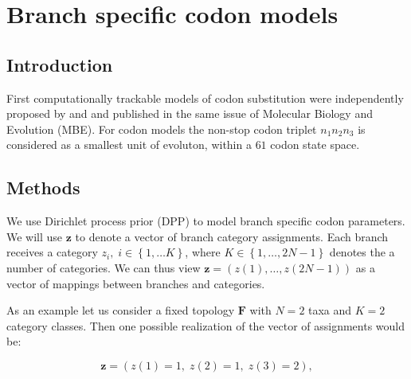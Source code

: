 \chapter{Branch specific codon models}

\section{Introduction}

First computationally trackable models of codon substitution were independently proposed by \cite{Muse1994} and \cite{Goldman1994} and published in the same issue of Molecular Biology and Evolution (MBE).
For codon models the non-stop codon triplet $n_{1}n_{2}n_{3}$ is considered as a smallest unit of evoluton, within a $61$ codon state space.



































\section{Methods}
We use Dirichlet process prior (DPP) to model branch specific codon parameters.
We will use $\mathbf{z}$ to denote a vector of branch category assignments.
Each branch receives a category $z_{i},\; i\in\left\{ 1,\ldots K\right\}$, where $K\in\left\{ 1,\ldots,2N-1\right\}$ denotes the a number of categories.
We can thus view $\mathbf{z}=\left(z(1),\ldots,z(2N-1)\right)$ as a vector of mappings between branches and categories.
 
As an example let us consider a fixed topology $\mathbf{F}$ with $N=2$ taxa and $K=2$ category classes.
Then one possible realization of the vector of assignments would be:

$$\mathbf{z}=\left(z(1)=1,\; z(2)=1,\; z(3)=2\right),$$
 

